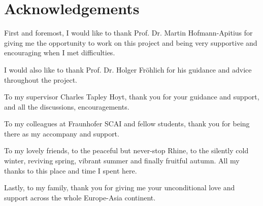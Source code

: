 \chapter*{Acknowledgements}

First and foremost, I would like to thank Prof. Dr. Martin Hofmann-Apitius for giving me the opportunity to work on this project and being very supportive and encouraging when I met difficulties.

I would also like to thank Prof. Dr. Holger Fröhlich for his guidance and advice throughout the project.

To my supervisor Charles Tapley Hoyt, thank you for your guidance and support, and all the discussions, encouragements.

To my colleagues at Fraunhofer SCAI and fellow students, thank you for being there as my accompany and support.

To my lovely friends, to the peaceful but never-stop Rhine, to the silently cold winter, reviving spring, vibrant summer and finally fruitful autumn. All my thanks to this place and time I spent here.

Lastly, to my family, thank you for giving me your unconditional love and support across the whole Europe-Asia continent.
